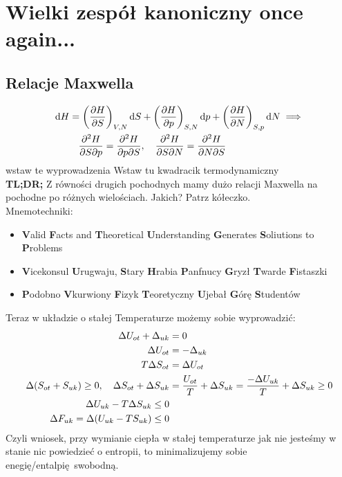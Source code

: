 \documentclass[12pt,a4paper]{report}
\newcommand{\com}[1]{{\color{red} #1}}
\renewcommand{\emph}{\textbf}
\newenvironment{lecture}[1]{\par\medskip
   \noindent\chapter{#1} \rmfamily}{\medskip}
\begin{document}
\begin{lecture}{Wielki zespół kanoniczny once again...}
\section{Relacje Maxwella}
\begin{align*}
\dd{H} = \qty(\pdv{H}{S})_{V,N} \dd{S} &+ \qty(\pdv{H}{p})_{S, N} \dd{p} + \qty(\pdv{H}{N})_{S,p} \dd{N} \implies\\
\pdv{H}{S}{p} = \pdv{H}{p}{S} &\qc \pdv{H}{S}{N} = \pdv{H}{N}{S}\\
\end{align*}
\com{wstaw te wyprowadzenia}
\com{Wstaw tu kwadracik termodynamiczny}\\
\emph{TL;DR;} Z równości drugich pochodnych mamy dużo relacji Maxwella na pochodne po różnych wielościach. Jakich? Patrz kółeczko.\\
Mnemotechniki:
\begin{itemize}
    \item \emph{V}alid \emph{F}acts and \emph{T}heoretical \emph{U}nderstanding \emph{G}enerates \emph{S}oliutions to \emph{P}roblems
    \item \emph{V}icekonsul \emph{U}rugwaju, \emph{S}tary \emph{H}rabia \emph{P}anfnucy \emph{G}ryzł \emph{T}warde \emph{F}istaszki
    \item \emph{P}odobno \emph{V}kurwiony \emph{F}izyk \emph{T}eoretyczny \emph{U}jebał \emph{G}órę \emph{S}tudentów
\end{itemize}

Teraz w układzie o stałej Temperaturze możemy sobie wyprowadzić:
\begin{align*}
    \Delta U_{ot} + \Delta _{uk} &= 0\\
    \Delta U_{ot} &= - \Delta _{uk}\\
    T \Delta S_{ot} &= \Delta U_{ot}\\
    \Delta (S_{ot} + S_{uk}) \geq 0 \qc \Delta S_{ot} + \Delta S_{uk} &= \frac{U_{ot}}{T} + \Delta S_{uk} = \frac{-\Delta U_{uk}}{T} + \Delta S_{uk} \geq 0 \\
    \Delta U_{uk} - T \Delta S_{uk} \leq 0\\
    \Delta F_{uk} = \Delta(U_{uk} - T S_{uk}) \leq 0
\end{align*}
Czyli wniosek, przy wymianie ciepła w stałej temperaturze jak nie jesteśmy w stanie nic powiedzieć o entropii, to minimalizujemy sobie enegię/entalpię swobodną.
\end{lecture}

\end{document}
